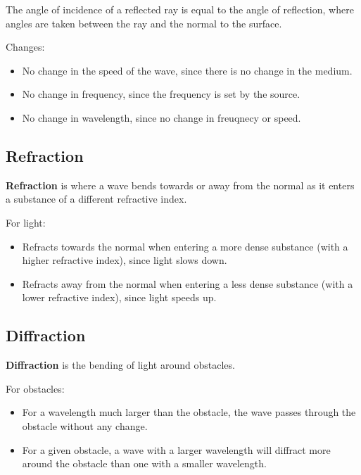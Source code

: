 \documentclass[a4paper,11pt]{report}
\begin{document}
The angle of incidence of a reflected ray is equal to the angle of reflection,
where angles are taken between the ray and the normal to the surface.

Changes:

\begin{itemize}
\item No change in the speed of the wave, since there is no change in the
	medium.
\item No change in frequency, since the frequency is set by the source.
\item No change in wavelength, since no change in freuqnecy or speed.
\end{itemize}

\subsection{Refraction}


\textbf{Refraction} is where a wave bends towards or away from the normal as it
enters a substance of a different refractive index.

For light:

\begin{itemize}
\item Refracts towards the normal when entering a more dense substance (with
	a higher refractive index), since light slows down.
\item Refracts away from the normal when entering a less dense substance (with
	a lower refractive index), since light speeds up.
\end{itemize}

\subsection{Diffraction}


\textbf{Diffraction} is the bending of light around obstacles.

For obstacles:

\begin{itemize}
\item For a wavelength much larger than the obstacle, the wave passes through
	the obstacle without any change.
\item For a given obstacle, a wave with a larger wavelength will diffract more
	around the obstacle than one with a smaller wavelength.
\end{itemize}
\end{document}

